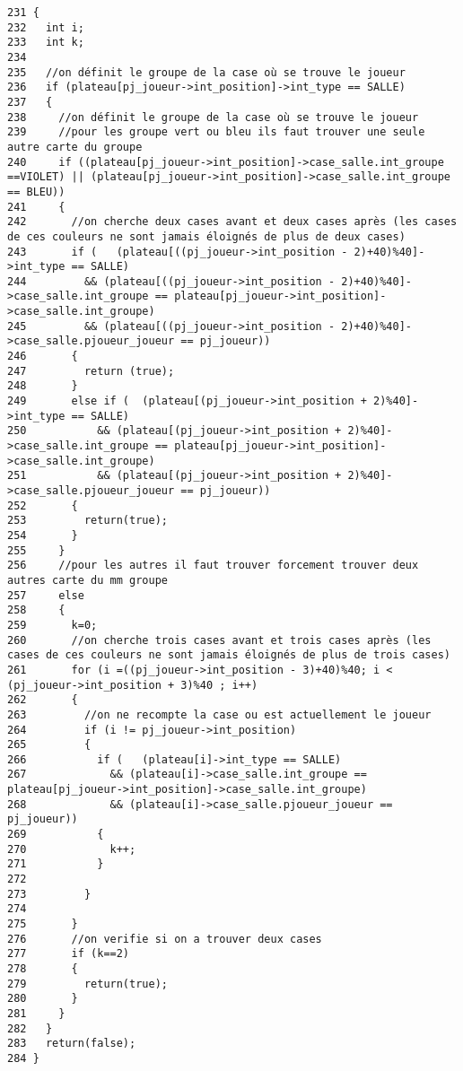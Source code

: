 \begin{Code}\begin{verbatim}231 {
232   int i;
233   int k;
234   
235   //on définit le groupe de la case où se trouve le joueur
236   if (plateau[pj_joueur->int_position]->int_type == SALLE)
237   {
238     //on définit le groupe de la case où se trouve le joueur
239     //pour les groupe vert ou bleu ils faut trouver une seule autre carte du groupe
240     if ((plateau[pj_joueur->int_position]->case_salle.int_groupe ==VIOLET) || (plateau[pj_joueur->int_position]->case_salle.int_groupe == BLEU))
241     {
242       //on cherche deux cases avant et deux cases après (les cases de ces couleurs ne sont jamais éloignés de plus de deux cases)
243       if (   (plateau[((pj_joueur->int_position - 2)+40)%40]->int_type == SALLE)
244         && (plateau[((pj_joueur->int_position - 2)+40)%40]->case_salle.int_groupe == plateau[pj_joueur->int_position]->case_salle.int_groupe)
245         && (plateau[((pj_joueur->int_position - 2)+40)%40]->case_salle.pjoueur_joueur == pj_joueur))
246       {
247         return (true);
248       }
249       else if (  (plateau[(pj_joueur->int_position + 2)%40]->int_type == SALLE)
250           && (plateau[(pj_joueur->int_position + 2)%40]->case_salle.int_groupe == plateau[pj_joueur->int_position]->case_salle.int_groupe)
251           && (plateau[(pj_joueur->int_position + 2)%40]->case_salle.pjoueur_joueur == pj_joueur))
252       {
253         return(true);
254       }
255     }
256     //pour les autres il faut trouver forcement trouver deux autres carte du mm groupe
257     else 
258     {
259       k=0;
260       //on cherche trois cases avant et trois cases après (les cases de ces couleurs ne sont jamais éloignés de plus de trois cases)
261       for (i =((pj_joueur->int_position - 3)+40)%40; i < (pj_joueur->int_position + 3)%40 ; i++)
262       {
263         //on ne recompte la case ou est actuellement le joueur
264         if (i != pj_joueur->int_position)
265         {
266           if (   (plateau[i]->int_type == SALLE)
267             && (plateau[i]->case_salle.int_groupe == plateau[pj_joueur->int_position]->case_salle.int_groupe)
268             && (plateau[i]->case_salle.pjoueur_joueur == pj_joueur))
269           {
270             k++;
271           }
272           
273         }
274         
275       }
276       //on verifie si on a trouver deux cases
277       if (k==2)
278       {
279         return(true);
280       }     
281     }
282   }
283   return(false);
284 }
\end{verbatim}\end{Code}


